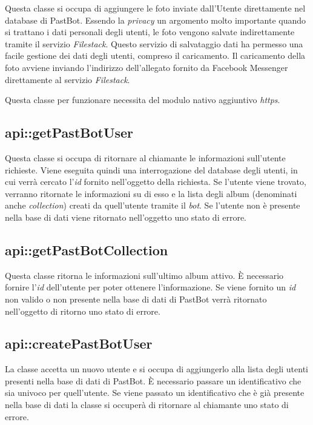 Questa classe si occupa di aggiungere le foto inviate dall'Utente direttamente
nel database di PastBot. Essendo la \textit{privacy} un argomento molto
importante quando si trattano i dati personali degli utenti, le foto vengono
salvate indirettamente tramite il servizio \textit{Filestack}. Questo
servizio di salvataggio dati ha permesso una facile gestione dei dati degli
utenti, compreso il caricamento. Il caricamento della foto avviene inviando
l'indirizzo dell'allegato fornito da Facebook Messenger direttamente al
servizio \textit{Filestack}.


Questa classe per funzionare necessita del modulo nativo aggiuntivo
\textit{https}.

\subsection{api::getPastBotUser}

Questa classe si occupa di ritornare al chiamante le informazioni sull'utente
richieste. Viene eseguita quindi una interrogazione del database degli utenti,
in cui verrà cercato l'\textit{id} fornito nell'oggetto della richiesta. Se
l'utente viene trovato, verranno ritornate le informazioni su di esso e la
lista degli album (denominati anche \textit{collection}) creati da quell'utente
tramite il \textit{bot}.
Se l'utente non è presente nella base di dati viene ritornato nell'oggetto uno
stato di errore.

\subsection{api::getPastBotCollection}

Questa classe ritorna le informazioni sull'ultimo album attivo. È necessario
fornire l'\textit{id} dell'utente per poter ottenere l'informazione.
Se viene fornito un \textit{id} non valido o non presente nella base di dati di
PastBot verrà ritornato nell'oggetto di ritorno uno stato di errore.

\subsection{api::createPastBotUser}

La classe accetta un nuovo utente e si occupa di aggiungerlo alla lista
degli utenti presenti nella base di dati di PastBot. È necessario passare un
identificativo che sia univoco per quell'utente. Se viene passato un
identificativo che è già presente nella base di dati la classe si occuperà di
ritornare al chiamante uno stato di errore.

